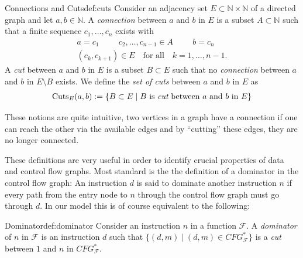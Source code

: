    \begin{definition}{Connections and Cuts}{def:cuts}
        Consider an adjacency set $E\subset\mathbb{N}\times\mathbb{N}$ of a
        directed graph and let $a,b\in\mathbb{N}$.
        \newline
        A {\em connection} between $a$ and $b$ in $E$ is a subset
        $A\subset\mathbb{N}$ such that a finite sequence $c_1,\dots,c_n$
        exists with
        \begin{gather*}
            a=c_1\hspace{1cm}c_2,\dots,c_{n-1}\in A\hspace{1cm}b=c_n\\
            (c_k,c_{k+1})\in E\hspace{1em}\text{for all}\hspace{1em}k=1,\dots,n-1.
        \end{gather*}
        A {\em cut} between $a$ and $b$ in $E$ is a subset $B\subset E$
        such that no {\em connection} between $a$ and $b$ in $E\setminus B$
        exists.
        We define the {\em set of cuts} between $a$ and $b$ in $E$ as
        \begin{align*}
            \text{Cuts}_E(a,b):=\{B\subset E\mid B\text{ is {\em cut} between $a$ and $b$ in $E$}\}
        \end{align*}
    \end{definition}

    These notions are quite intuitive, two vertices in a graph have a connection
    if one can reach the other via the available edges and by ``cutting'' these
    edges, they are no longer connected.

    These definitions are very useful in order to identify crucial properties of
    data and control flow graphs.
    Most standard is the the definition of a dominator in the control flow
    graph: An instruction $d$ is said to dominate another instruction $n$ if
    every path from the entry node to $n$ through the control flow graph must
    go through $d$.
    In our model this is of course equivalent to the following:

    \begin{definition}{Dominator}{def:dominator}
        Consider an instruction $n$ in a function $\mathcal F$.
        A {\em dominator} of $n$ in $\mathcal{F}$ is an instruction $d$ such
        that $\{(d,m)\mid(d,m)\in CFG_\mathcal{F}^*\}$ is a {\em cut} between $1$ and $n$ in $CFG_\mathcal{F}^*$.
    \end{definition}

